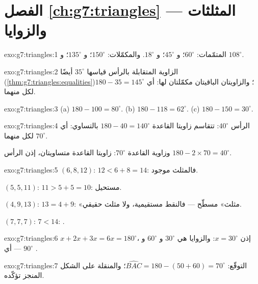 \section*{الفصل \ref{ch:g7:triangles} --- المثلثات والزوايا}

\begin{solution}{exo:g7:triangles:1}
المتمّمات: $60^\circ$؛ و $45^\circ$؛ و $18^\circ$.
والمكمّلات: $150^\circ$؛ و $135^\circ$؛ و $108^\circ$.
\end{solution}

\begin{solution}{exo:g7:triangles:2}
الزاوية المتقابلة بالرأس قياسها $35^\circ$ أيضًا
(\cref{thm:g7:triangles:equalities})؛ والزاويتان الباقيتان
مكمّلتان لها: أي $180 - 35 = 145^\circ$ لكل منهما.
\end{solution}

\begin{solution}{exo:g7:triangles:3}
(a) $180 - 100 = 80^\circ$. \quad
(b) $180 - 118 = 62^\circ$. \quad
(c) $180 - 150 = 30^\circ$.
\end{solution}

\begin{solution}{exo:g7:triangles:4}
الرأس $40^\circ$: تتقاسم زاويتا القاعدة $180 - 40 = 140^\circ$
بالتساوي: أي $70^\circ$ لكل منهما.

وزاوية القاعدة $70^\circ$: زاويتا القاعدة متساويتان، إذن الرأس
$180 - 2 \times 70 = 40^\circ$.
\end{solution}

\begin{solution}{exo:g7:triangles:5}
$(6, 8, 12)$: $12 < 6 + 8 = 14$: فالمثلث موجود.

$(5, 5, 11)$: $11 > 5 + 5 = 10$: مستحيل.

$(4, 9, 13)$: $13 = 4 + 9$: «مثلث» مسطّح --- فالنقط
مستقيمية، ولا مثلث حقيقي.

$(7, 7, 7)$: $7 < 14$: .
\end{solution}

\begin{solution}{exo:g7:triangles:6}
$x + 2x + 3x = 6x = 180^\circ$، إذن $x = 30^\circ$: والزوايا هي
$30^\circ$ و $60^\circ$ و $90^\circ$ --- أي .
\end{solution}

\begin{solution}{exo:g7:triangles:7}
التوقّع: $\widehat{BAC} = 180 - (50 + 60) = 70^\circ$؛ والمنقلة
على الشكل المنجز تؤكّده.
\end{solution}

